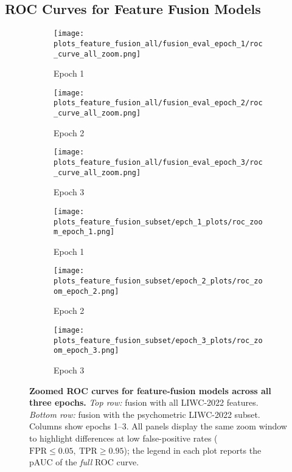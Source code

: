 \subsection{ROC Curves for Feature Fusion Models}


\begin{figure}[H]
  \centering


  \begin{subfigure}[t]{0.32\textwidth}
    \centering
    \texttt{[image: plots\_feature\_fusion\_all/fusion\_eval\_epoch\_1/roc\_curve\_all\_zoom.png]}
    \caption{Epoch 1}
    \label{fig:ffroc_psy_e1}
  \end{subfigure}\hfill
  \begin{subfigure}[t]{0.32\textwidth}
    \centering
    \texttt{[image: plots\_feature\_fusion\_all/fusion\_eval\_epoch\_2/roc\_curve\_all\_zoom.png]}
    \caption{Epoch 2}
    \label{fig:ffroc_psy_e2}
  \end{subfigure}\hfill
  \begin{subfigure}[t]{0.32\textwidth}
    \centering
    \texttt{[image: plots\_feature\_fusion\_all/fusion\_eval\_epoch\_3/roc\_curve\_all\_zoom.png]}
    \caption{Epoch 3}
    \label{fig:ffroc_psy_e3}
  \end{subfigure}

    \vspace{0.45cm}


    \begin{subfigure}[t]{0.32\textwidth}
    \centering
    \texttt{[image: plots\_feature\_fusion\_subset/epch\_1\_plots/roc\_zoom\_epoch\_1.png]}
    \caption{Epoch 1}
    \label{fig:ffroc_all_e1}
  \end{subfigure}\hfill
  \begin{subfigure}[t]{0.32\textwidth}
    \centering
    \texttt{[image: plots\_feature\_fusion\_subset/epoch\_2\_plots/roc\_zoom\_epoch\_2.png]}
    \caption{Epoch 2}
    \label{fig:ffroc_all_e2}
  \end{subfigure}\hfill
  \begin{subfigure}[t]{0.32\textwidth}
    \centering
    \texttt{[image: plots\_feature\_fusion\_subset/epoch\_3\_plots/roc\_zoom\_epoch\_3.png]}
    \caption{Epoch 3}
    \label{fig:ffroc_all_e3}
  \end{subfigure}


  \caption[Zoomed ROC curves for feature-fusion models across epochs.]{\textbf{Zoomed ROC curves for feature-fusion models across all three epochs.}
  \emph{Top row:} fusion with all LIWC-2022 features. \emph{Bottom row:} fusion with the psychometric LIWC-2022 subset.
  Columns show epochs 1–3. All panels display the same zoom window to highlight differences at low false-positive rates
  (\(\mathrm{FPR}\le 0.05,\ \mathrm{TPR}\ge 0.95\)); the legend in each plot reports the pAUC of the \emph{full} ROC curve.}
  \label{fig:ff_roc_zoom_epochs}
\end{figure}

